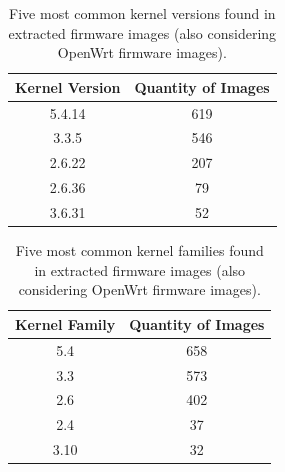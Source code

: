 
\begin{table}[h]
\centering
\caption{Five most common kernel versions found in extracted firmware images (also considering OpenWrt firmware images).}
\begin{tabular}{cc}
\hline
\textbf{Kernel Version} & \textbf{Quantity of Images} \\ \hline
5.4.14                  & 619                \\
3.3.5                   & 546                \\
2.6.22                  & 207                \\
2.6.36                  & 79                 \\
3.6.31                  & 52                 \\ \hline
\end{tabular}
\label{tab:kernel-stats-openwrt}
\end{table}

\begin{table}[h]
\centering
\caption{Five most common kernel families found in extracted firmware images (also considering OpenWrt firmware images).}
\begin{tabular}{cc}
\hline
\textbf{Kernel Family} & \textbf{Quantity of Images} \\ \hline
5.4                    & 658                \\ 
3.3                    & 573                \\ 
2.6                    & 402                \\ 
2.4                    & 37                 \\ 
3.10                   & 32                 \\ \hline
\end{tabular}
\label{tab:kernel-family-stats-openwrt}
\end{table}

